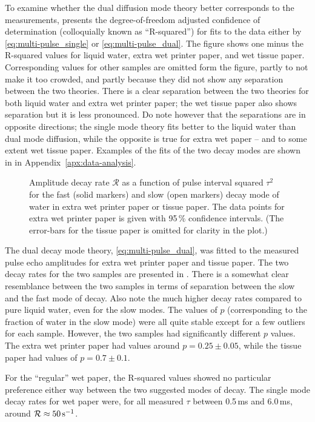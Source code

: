 \documentclass[11pt,a4paper, twocolumn,
swedish, english %
]{article}
\begin{document}
To examine whether the dual diffusion mode theory better corresponds
to the measurements,  presents the
degree-of-freedom adjusted confidence of determination (colloquially
known as ``R-squared'') for fits to the data either by
\eqref{eq:multi-pulse_single} or \eqref{eq:multi-pulse_dual}. The
figure shows one minus the R-squared values for liquid water, extra
wet printer paper, and wet tissue paper. Corresponding values for other
samples are omitted form the figure, partly to not make it too
crowded, and partly because they did not show any separation between
the two theories. There is a clear separation between the two theories for
both liquid water and extra wet printer paper; the wet tissue paper
also shows separation but it is less pronounced. 
Do note however that the separations are in opposite directions; the
single mode theory fits better to the liquid water than dual mode
diffusion, while the opposite is true for extra wet paper -- and to
some extent wet tissue paper. Examples of the fits of the two decay
modes are shown in  in
Appendix~\ref{apx:data-analysis}.


\begin{figure*}
\centering

\caption{Amplitude decay rate $\mathcal{R}$ as a function of pulse
  interval squared $\tau^2$ for the fast (solid markers) and slow
  (open markers) decay mode of water in extra wet printer paper or
  tissue paper. The data points for extra wet printer paper is given
  with 95\,\% confidence intervals. (The error-bars for the tissue
  paper is omitted for clarity in the plot.) } 
\label{fig:dual-diff}
\end{figure*}

The dual decay mode theory, \eqref{eq:multi-pulse_dual}, was fitted to
the measured pulse echo amplitudes for extra wet printer paper and
tissue paper. 
The two decay rates for the two samples are presented in
. There is a somewhat clear resemblance between
the two samples in terms of separation between the slow and the fast
mode of decay. Also note the much higher decay rates compared to pure
liquid  water, even for the slow modes. The values of $p$
(corresponding to the fraction of water in the slow mode) were all
quite stable except for a few outliers for each sample. However, the
two samples had significantly different $p$ values. The extra wet
printer paper had values around $p=0.25\pm0.05$, while the tissue
paper had values of $p=0.7\pm0.1$.

For the ``regular'' wet paper, the R-squared values showed no
particular preference either way between the two suggested modes of
decay. The single mode decay rates for wet paper were, for all
measured $\tau$ between 0.5\,ms and 6.0\,ms, around
$\mathcal{R}\approx\unit[50]{s^{-1}}$. 
\end{document}
